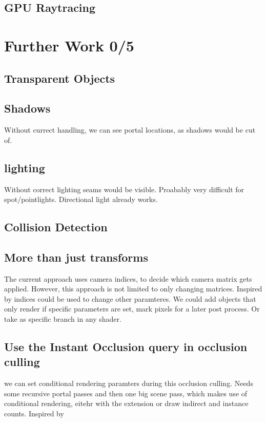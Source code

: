 \subsection{GPU Raytracing}

\section{Further Work 0/5}
\subsection{Transparent Objects}
\subsection{Shadows}
Without currect handling, we can see portal locations, as shadows would be cut of.
\subsection{lighting}
Without correct lighting seams would be visible. Proabably very difficult for spot/pointlights. Directional light already works.
\subsection{Collision Detection}

\subsection{More than just transforms}
\label{more than transforms}
The current approach uses camera indices, to decide which camera matrix gets applied. However, this approach is not limited to only changing matrices. Inspired by \cite{borst:2009:real} indices could be used to change other paramteres. We could add objects that only render if specific parameters are set, mark pixels for a later post process. Or take as specific branch in any shader.


\subsection{Use the Instant Occlusion query in occlusion culling}
we can set conditional rendering paramters during this occlusion culling.
Needs some  recursive portal passes and then one big scene pass, which makes use of conditional rendering, eitehr with the extension or draw indirect and instance counts. Inspired by \cite{yang:2014:walkthrough}

